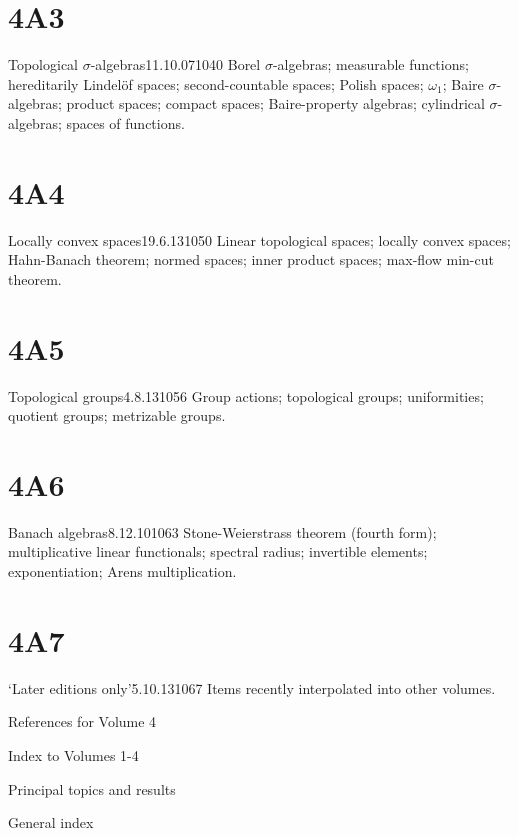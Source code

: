 \section{4A3}{Topological $\sigma$-algebras}{11.10.07}{1040}{}
{Borel $\sigma$-algebras;  measurable functions;  hereditarily
Lindel\"of spaces;  second-countable spaces;  Polish spaces;
$\omega_1$;  Baire $\sigma$-algebras;  product spaces;  compact spaces;
Baire-property algebras;  cylindrical $\sigma$-algebras;  spaces of
\cadlag{} functions.}

\section{4A4}{Locally convex spaces}{19.6.13}{1050}{}
{Linear topological spaces;  locally convex spaces;  Hahn-Banach
theorem;  normed spaces;  inner product spaces;  max-flow min-cut
theorem.}

\section{4A5}{Topological groups}{4.8.13}{1056}{}
{Group actions;  topological groups;  uniformities;  quotient groups;
metrizable groups.}

\section{4A6}{Banach algebras}{8.12.10}{1063}{}
{Stone-Weierstrass theorem (fourth form);  multiplicative linear
functionals;  spectral radius;  invertible elements;  exponentiation; 
Arens multiplication.}

\section{4A7}{`Later editions only'}{5.10.13}{1067}{}
{Items recently interpolated into other volumes.}



\medskip

References for Volume 4 

\medskip

Index to Volumes 1-4

\qquad Principal topics and results 

\qquad General index 



